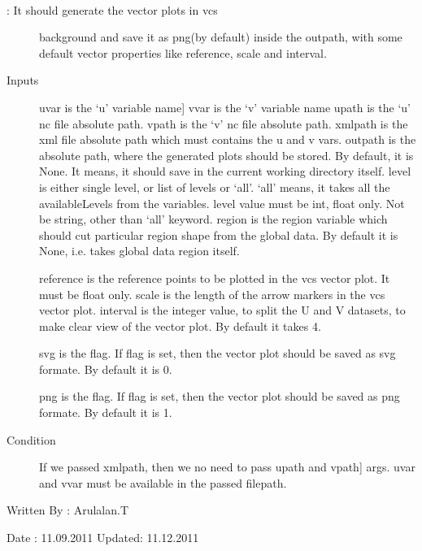 \documentclass[letterpaper,10pt,english]{sphinxmanual}
\begin{document}
\begin{fulllineitems}
\label{diagnosis:generate_winds_plots.genVectorPlots}~\begin{description}
\item[{{\hyperref[diagnosis:generate_winds_plots.genVectorPlots]{}}: It should generate the vector plots in vcs}] \leavevmode
background and save it as png(by default) inside the outpath,
with some default vector properties like reference, scale and
interval.

\item[{Inputs}] \leavevmode{[}uvar is the `u' variable name{]}
vvar is the `v' variable name
upath is the `u' nc file absolute path.
vpath is the `v' nc file absolute path.
xmlpath is the xml file absolute path which must contains the
u and v vars.
outpath is the absolute path, where the generated plots should be
stored. By default, it is None. It means, it should save in the
current working directory itself.
level is either single level, or list of levels or `all'.
`all' means, it takes all the availableLevels from the variables.
level value must be int, float only. Not be string, other than
`all' keyword.
region is the region variable which should cut particular region
shape from the global data. By default it is None, i.e. takes
global data region itself.

reference is the reference points to be plotted in the vcs
vector plot. It must be float only.
scale is the length of the arrow markers in the vcs vector plot.
interval is the integer value, to split the U and V datasets,
to make clear view of the vector plot. By default it takes 4.

svg is the flag. If flag is set, then the vector plot should be
saved as svg formate. By default it is 0.

png is the flag. If flag is set, then the vector plot should be
saved as png formate. By default it is 1.

\item[{Condition}] \leavevmode{[}If we passed xmlpath, then we no need to pass upath and vpath{]}
args. uvar and vvar must be available in the passed filepath.

\end{description}

Written By : Arulalan.T

Date : 11.09.2011
Updated: 11.12.2011

\end{fulllineitems}
\end{document}
